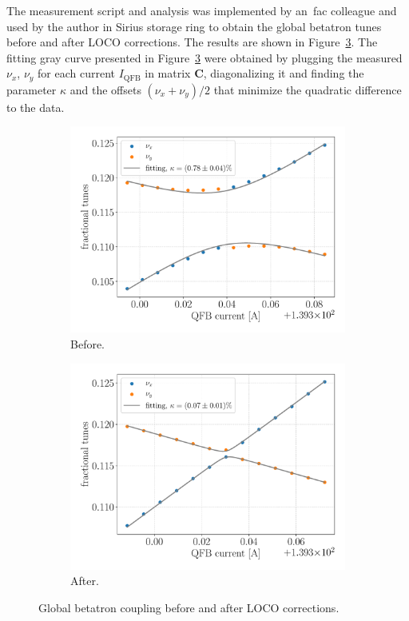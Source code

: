 The measurement script and analysis was implemented by an~\gls{fac} colleague and used by the author in Sirius storage ring to obtain the global betatron tunes before and after LOCO corrections. The results are shown in Figure~\ref{fig:global_coupling}. The fitting gray curve presented in Figure~\ref{fig:global_coupling} were obtained by plugging the measured $\nu_x$, $\nu_y$ for each current $I_{\mathrm{QFB}}$ in matrix $\mathbf{C}$, diagonalizing it and finding the parameter $\kappa$ and the offsets $(\nu_x+\nu_y)/2$ that minimize the quadratic difference to the data.
\begin{figure}
\centering
\begin{subfigure}[t]{0.49\textwidth}
\includegraphics[width=1.0\textwidth]{figures/coupling_before_loco_grid_filter.pdf}
    \caption{Before.}
    \label{subfig:coup_before}
\end{subfigure}
 \begin{subfigure}[t]{0.49\textwidth}
\includegraphics[width=1.0\textwidth]{figures/coupling_after_loco_grid_filter.pdf}
    \caption{After.}
    \label{subfig:coup_after}
\end{subfigure}
\caption{Global betatron coupling before and after LOCO corrections.}
\label{fig:global_coupling}
\end{figure}

